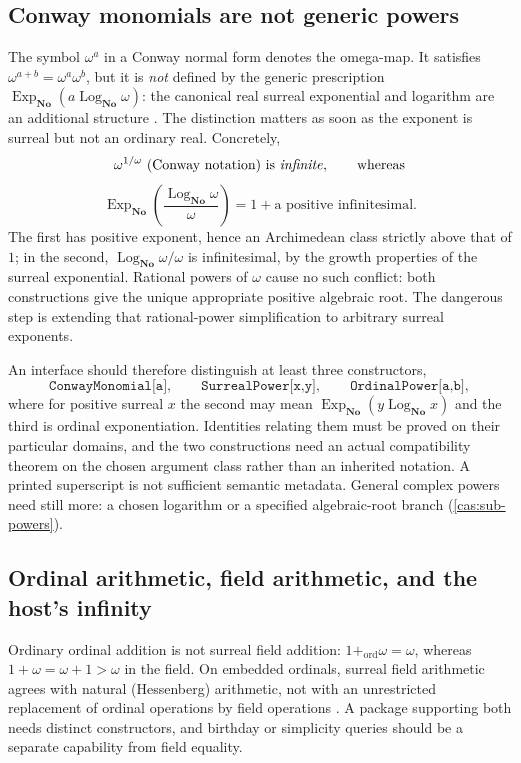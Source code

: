 \documentclass[11pt,letterpaper]{article}
\numberwithin{equation}{section}
\theoremstyle{definition}
\theoremstyle{remark}
\newcommand{\No}{\mathbf{No}}
\newcommand{\ExpNo}{\operatorname{Exp}_{\No}}
\newcommand{\LogNo}{\operatorname{Log}_{\No}}
\begin{document}
\subsection{Conway monomials are not generic powers}
\label{cas:sub-conway}
The symbol $\omega^a$ in a Conway normal form denotes the omega-map. It satisfies
$\omega^{a+b}=\omega^a\omega^b$, but it is \emph{not} defined by the generic
prescription $\ExpNo(a\LogNo\omega)$: the canonical real surreal exponential and
logarithm are an additional structure \cite{cas:Gonshor,cas:vdDE}. The
distinction matters as soon as the exponent is surreal but not an ordinary real.
Concretely,
\[
 \omega^{1/\omega}\ \text{(Conway notation) is \emph{infinite}},
 \qquad\text{whereas}
\]
\[
 \ExpNo\!\left(\frac{\LogNo\omega}{\omega}\right)
 =1+\text{a positive infinitesimal}.
\]
The first has positive exponent, hence an Archimedean class strictly above that
of $1$; in the second, $\LogNo\omega/\omega$ is infinitesimal, by the growth
properties of the surreal exponential. Rational powers of $\omega$ cause no such
conflict: both constructions give the unique appropriate positive algebraic
root. The dangerous step is extending that rational-power simplification to
arbitrary surreal exponents.

An interface should therefore distinguish at least three constructors,
\[
 \texttt{ConwayMonomial[a]},\qquad \texttt{SurrealPower[x,y]},\qquad
 \texttt{OrdinalPower[a,b]},
\]
where for positive surreal $x$ the second may mean $\ExpNo(y\LogNo x)$ and the
third is ordinal exponentiation. Identities relating them must be proved on
their particular domains, and the two constructions need an actual compatibility
theorem on the chosen argument class rather than an inherited notation. A
printed superscript is not sufficient semantic metadata. General complex powers
need still more: a chosen logarithm or a specified algebraic-root branch
(\cref{cas:sub-powers}).

\subsection{Ordinal arithmetic, field arithmetic, and the host's infinity}
\label{cas:sub-ordinals}
Ordinary ordinal addition is not surreal field addition:
$1+_{\mathrm{ord}}\omega=\omega$, whereas $1+\omega=\omega+1>\omega$ in the
field. On embedded ordinals, surreal field arithmetic agrees with natural
(Hessenberg) arithmetic, not with an unrestricted replacement of ordinal
operations by field operations \cite{cas:Conway}. A package supporting both
needs distinct constructors, and birthday or simplicity queries should be a
separate capability from field equality.
\end{document}
